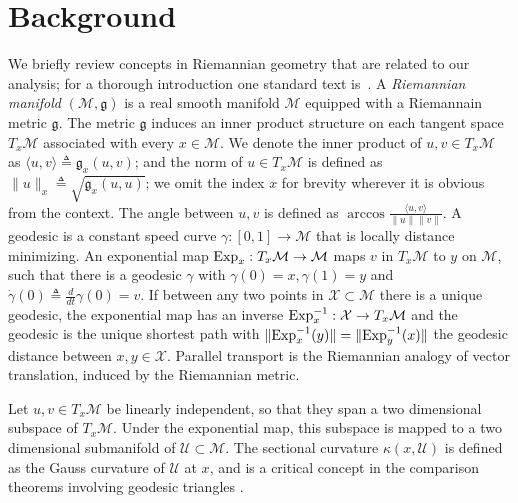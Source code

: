 \section{Background}


We briefly review concepts in Riemannian geometry that are related to our analysis; for a thorough introduction one standard text is~\citep[e.g.][]{jost2011riemannian}. A \emph{Riemannian manifold} $(\mathcal{M}, \mathfrak{g})$ is a real smooth manifold $\mathcal{M}$ equipped with a Riemannain metric $\mathfrak{g}$. The metric $\mathfrak{g}$ induces an inner product structure on each tangent space $T_x\mathcal{M}$ associated with every $x\in\mathcal{M}$.  We denote the inner product of $u,v\in T_x\mathcal{M}$ as $\langle u, v \rangle \triangleq \mathfrak{g}_x(u,v)$; and the norm of $u\in T_x\mathcal{M}$ is defined as $\|u\|_x \triangleq \sqrt{\mathfrak{g}_x(u,u)}$; we omit the index $x$ for brevity wherever it is obvious from the context. The angle between $u,v$ is defined as $\arccos\frac{\langle u, v \rangle}{\|u\|\|v\|}$. A geodesic is a constant speed curve $\gamma: [0,1]\to\mathcal{M}$ that is locally distance minimizing. An exponential map $\mathrm{Exp}_x:T_x\mathcal{M}\to\mathcal{M}$ maps $v$ in $T_x\mathcal{M}$ to $y$ on $\mathcal{M}$, such that there is a geodesic $\gamma$ with $\gamma(0) = x, \gamma(1) = y$ and $\dot{\gamma}(0) \triangleq \frac{d}{dt}\gamma(0) = v$.  If between any two points in $\mathcal{X}\subset\mathcal{M}$ there is a unique geodesic, the exponential map has an inverse $\mathrm{Exp}_x^{-1}:\mathcal{X}\to T_x\mathcal{M}$ and the geodesic is the unique shortest path with $\|\mathrm{Exp}_x^{-1}(y)\| = \|\mathrm{Exp}_y^{-1}(x)\|$ the geodesic distance between $x,y\in\mathcal{X}$. Parallel transport is the Riemannian analogy of vector translation, induced by the Riemannian metric.

Let $u,v\in T_x\mathcal{M}$ be linearly independent, so that they span a two dimensional subspace of $T_x\mathcal{M}$. Under the exponential map, this subspace is mapped to a two dimensional submanifold of $\mathcal{U}\subset\mathcal{M}$. The sectional curvature $\kappa(x,\mathcal{U})$ is defined as the Gauss curvature of $\mathcal{U}$ at $x$, and is a critical concept in the comparison theorems involving geodesic triangles \citep{burago2001course}.

